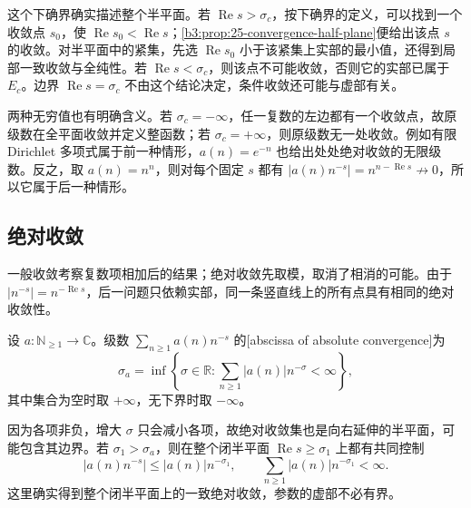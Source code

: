 这个下确界确实描述整个半平面。若 \(\operatorname{Re}s>\sigma_c\)，按下确界的定义，可以找到一个收敛点 \(s_0\)，使 \(\operatorname{Re}s_0<\operatorname{Re}s\)；\cref{b3:prop:25-convergence-half-plane}便给出该点 \(s\) 的收敛。对半平面中的紧集，先选 \(\operatorname{Re}s_0\) 小于该紧集上实部的最小值，还得到局部一致收敛与全纯性。若 \(\operatorname{Re}s<\sigma_c\)，则该点不可能收敛，否则它的实部已属于 \(E_c\)。边界 \(\operatorname{Re}s=\sigma_c\) 不由这个结论决定，条件收敛还可能与虚部有关。

两种无穷值也有明确含义。若 \(\sigma_c=-\infty\)，任一复数的左边都有一个收敛点，故原级数在全平面收敛并定义整函数；若 \(\sigma_c=+\infty\)，则原级数无一处收敛。例如有限 Dirichlet 多项式属于前一种情形，\(a(n)=e^{-n}\) 也给出处处绝对收敛的无限级数。反之，取 \(a(n)=n^n\)，则对每个固定 \(s\) 都有 \(|a(n)n^{-s}|=n^{n-\operatorname{Re}s}\not\to0\)，所以它属于后一种情形。

\subsection{绝对收敛}
\label{b3:subsec:250402}

一般收敛考察复数项相加后的结果；绝对收敛先取模，取消了相消的可能。由于 \(|n^{-s}|=n^{-\operatorname{Re}s}\)，后一问题只依赖实部，同一条竖直线上的所有点具有相同的绝对收敛性。

\begin{definition}[绝对收敛横坐标]\label{b3:def:25-absolute-abscissa}
设 \(a:\mathbb N_{\ge1}\to\mathbb C\)。级数 \(\sum_{n\ge1}a(n)n^{-s}\) 的[abscissa of absolute convergence]为
\[
 \sigma_a=\inf\left\{\sigma\in\mathbb R:
                 \sum_{n\ge1}|a(n)|n^{-\sigma}<\infty\right\},
\]
其中集合为空时取 \(+\infty\)，无下界时取 \(-\infty\)。
\end{definition}

因为各项非负，增大 \(\sigma\) 只会减小各项，故绝对收敛集也是向右延伸的半平面，可能包含其边界。若 \(\sigma_1>\sigma_a\)，则在整个闭半平面 \(\operatorname{Re}s\ge\sigma_1\) 上都有共同控制
\[
 |a(n)n^{-s}|\le |a(n)|n^{-\sigma_1},
 \qquad \sum_{n\ge1}|a(n)|n^{-\sigma_1}<\infty.
\]
这里确实得到整个闭半平面上的一致绝对收敛，参数的虚部不必有界。

